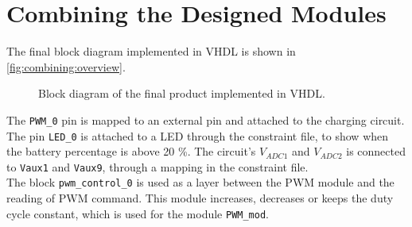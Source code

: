 \documentclass[../report.tex]{subfiles}
\begin{document}
\section{Combining the Designed Modules} \label{sec:combined}
The final block diagram implemented in VHDL is shown in \autoref{fig:combining:overview}.
\begin{figure}[H]
    \centering    
    \noindent{}
    \caption{Block diagram of the final product implemented in VHDL.}
    \label{fig:combining:overview}
\end{figure}
The \texttt{PWM\_0} pin is mapped to an external pin and attached to the charging circuit. The pin \texttt{LED\_0} is attached to a LED through the constraint file, to show when the battery percentage is above 20 \%. The circuit's $V_{ADC1}$ and $V_{ADC2}$ is connected to \texttt{Vaux1} and \texttt{Vaux9}, through a mapping in the constraint file.\\

The block \texttt{pwm\_control\_0} is used as a layer between the PWM module and the reading of PWM command. This module increases, decreases or keeps the duty cycle constant, which is used for the module \texttt{PWM\_{mod}}.
\end{document}

